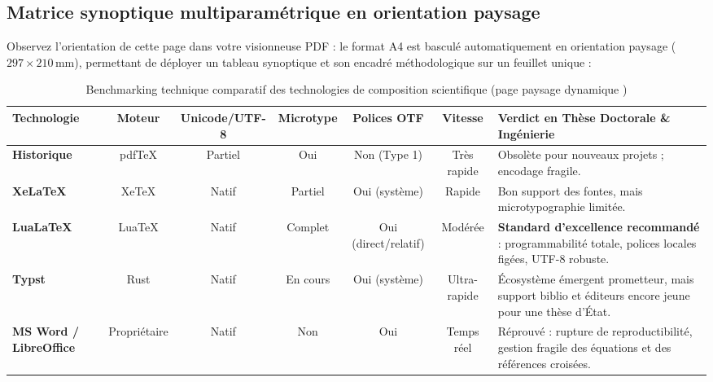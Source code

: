 \begin{landscape}
\activerStyleFocus

\subsection{Matrice synoptique multiparamétrique en orientation paysage}
Observez l'orientation de cette page dans votre visionneuse PDF :
le format A4 est basculé automatiquement en orientation paysage ($297 \times 210$\,mm), permettant de déployer un tableau synoptique et son encadré méthodologique sur un feuillet unique :

\begin{table}[htbp]
  \centering
  \footnotesize
  \renewcommand{\arraystretch}{1.1}
  \caption[Benchmarking technique comparatif des moteurs de composition scientifique]{Benchmarking technique comparatif des technologies de composition scientifique (page paysage dynamique )}
  \label{tab:benchmark-paysage}
  \begin{tabularx}{\linewidth}{@{} l c c c c c Y @{}}
    \toprule
    \textbf{Technologie} & \textbf{Moteur} & \textbf{Unicode/UTF-8} & \textbf{Microtype} & \textbf{Polices OTF} & \textbf{Vitesse} & \textbf{Verdict en Thèse Doctorale \& Ingénierie} \\
    \midrule
    \textbf{\LaTeXe{} Historique} & pdf\TeX{} & Partiel & Oui & Non (Type 1) & Très rapide & Obsolète pour nouveaux projets ; encodage fragile. \\
    \addlinespace[2pt]
    \textbf{Xe\LaTeX{}} & Xe\TeX{} & Natif & Partiel & Oui (système) & Rapide & Bon support des fontes, mais microtypographie limitée. \\
    \addlinespace[2pt]
    \textbf{Lua\LaTeX{}} & Lua\TeX{} & Natif & Complet & Oui (direct/relatif) & Modérée & \textbf{Standard d'excellence recommandé} : programmabilité totale, polices locales figées, UTF-8 robuste. \\
    \addlinespace[2pt]
    \textbf{Typst} & Rust & Natif & En cours & Oui (système) & Ultra-rapide & Écosystème émergent prometteur, mais support biblio et éditeurs encore jeune pour une thèse d'État. \\
    \addlinespace[2pt]
    \textbf{MS Word / LibreOffice} & Propriétaire & Natif & Non & Oui & Temps réel & Réprouvé : rupture de reproductibilité, gestion fragile des équations et des références croisées. \\
    \bottomrule
  \end{tabularx}
\end{table}


\end{landscape}

